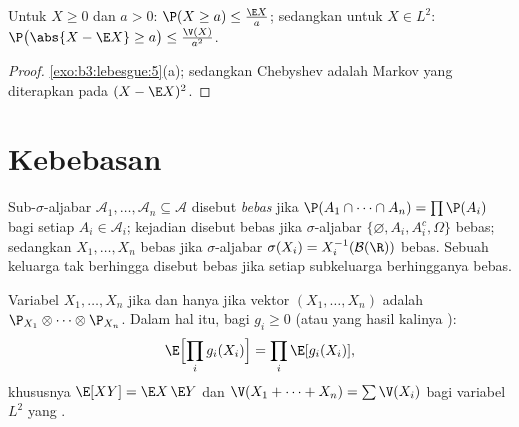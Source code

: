 \begin{proposition}
\label{prop:b3:probability:markov}
Untuk $X \geq 0$ dan $a > 0$: $\P(X \geq a) \leq \frac{\E
X}{a}$; sedangkan untuk $X \in L^2$: $\P\bigl(\abs{X - \E X} \geq
a\bigr) \leq \frac{\V(X)}{a^2}$.
\end{proposition}

\begin{proof}
\cref{exo:b3:lebesgue:5}(a); sedangkan Chebyshev adalah Markov yang diterapkan pada
$(X - \E X)^2$.
\end{proof}

\section{Kebebasan}

\begin{definition}\label{def:b3:probability:independence}
Sub-$\sigma$-aljabar $\mathcal A_1, \dots, \mathcal A_n
\subseteq \mathcal A$ disebut \emph{bebas}
jika $\P(A_1\cap\dots\cap A_n) = \prod\P(A_i)$ bagi setiap $A_i \in
\mathcal A_i$; kejadian disebut bebas jika $\sigma$-aljabar
$\{\varnothing, A_i, A_i^c, \Omega\}$ bebas; sedangkan 
$X_1, \dots, X_n$ bebas jika $\sigma$-aljabar $\sigma(X_i) =
X_i^{-1}(\mathcal B(\R))$ bebas. Sebuah keluarga tak berhingga
disebut bebas jika setiap subkeluarga berhingganya bebas.
\end{definition}

\begin{theorem}\label{thm:b3:probability:independence}
Variabel $X_1, \dots, X_n$  jika dan hanya jika  vektor
$(X_1, \dots, X_n)$ adalah 
$\P_{X_1}\otimes\cdots\otimes\P_{X_n}$. Dalam hal itu, bagi
$g_i \geq 0$ (atau yang hasil kalinya ):
\[
\E\Bigl[\prod_ig_i(X_i)\Bigr] = \prod_i\E[g_i(X_i)],
\]
khususnya $\E[XY] = \E X\,\E Y$ dan $\V(X_1 + \dots +
X_n) = \sum\V(X_i)$ bagi variabel $L^2$ yang .
\end{theorem}

